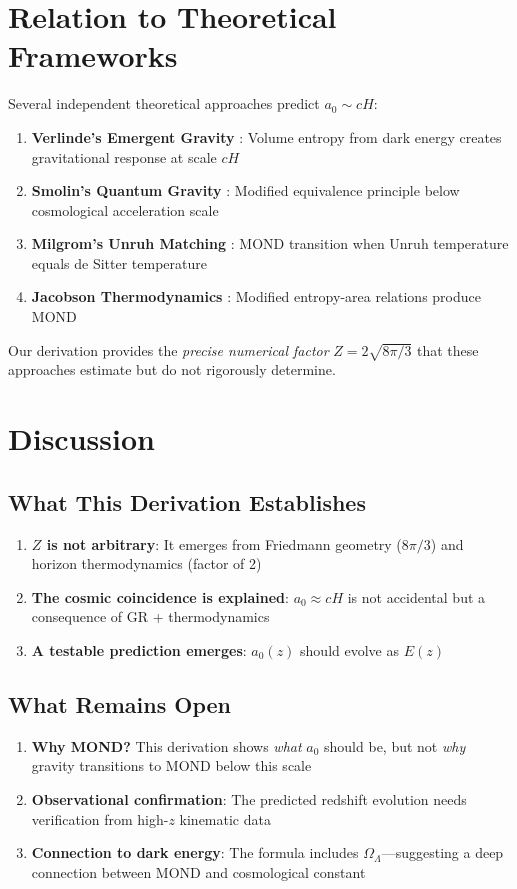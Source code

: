 \documentclass[twocolumn,showpacs,preprintnumbers,amsmath,amssymb,prd]{revtex4-2}
\begin{document}
\section{Relation to Theoretical Frameworks}

Several independent theoretical approaches predict $a_0 \sim cH$:
\begin{enumerate}
\item \textbf{Verlinde's Emergent Gravity} \cite{Verlinde2017}: Volume entropy from dark energy creates gravitational response at scale $cH$
\item \textbf{Smolin's Quantum Gravity} \cite{Smolin2017}: Modified equivalence principle below cosmological acceleration scale
\item \textbf{Milgrom's Unruh Matching} \cite{Milgrom2020}: MOND transition when Unruh temperature equals de Sitter temperature
\item \textbf{Jacobson Thermodynamics} \cite{Jacobson1995}: Modified entropy-area relations produce MOND
\end{enumerate}
Our derivation provides the \emph{precise numerical factor} $Z = 2\sqrt{8\pi/3}$ that these approaches estimate but do not rigorously determine.

\section{Discussion}

\subsection{What This Derivation Establishes}

\begin{enumerate}
\item \textbf{$Z$ is not arbitrary}: It emerges from Friedmann geometry ($8\pi/3$) and horizon thermodynamics (factor of 2)
\item \textbf{The cosmic coincidence is explained}: $a_0 \approx cH$ is not accidental but a consequence of GR + thermodynamics
\item \textbf{A testable prediction emerges}: $a_0(z)$ should evolve as $E(z)$
\end{enumerate}

\subsection{What Remains Open}

\begin{enumerate}
\item \textbf{Why MOND?} This derivation shows \emph{what} $a_0$ should be, but not \emph{why} gravity transitions to MOND below this scale
\item \textbf{Observational confirmation}: The predicted redshift evolution needs verification from high-$z$ kinematic data
\item \textbf{Connection to dark energy}: The formula includes $\Omega_\Lambda$---suggesting a deep connection between MOND and cosmological constant
\end{enumerate}
\end{document}
